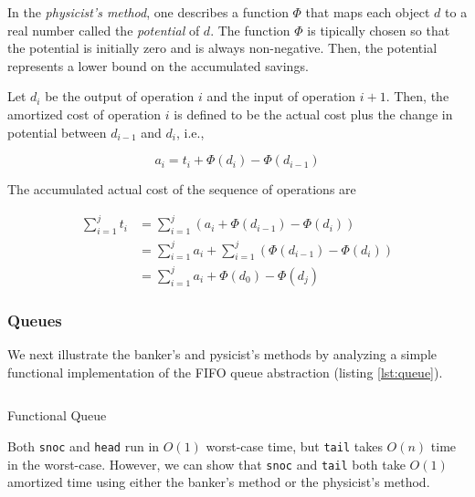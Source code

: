 \documentclass[12pt, a4paper]{article} %
\newcommand{\code}[1]{\texttt{#1}} %
\begin{document}
In the \textit{physicist's method}, one describes a function $\Phi$ that maps each object $d$ to a real number called the \textit{potential} of $d$. The function $\Phi$ is tipically chosen so that the potential is initially zero and is always non-negative. Then, the potential represents a lower bound on the accumulated savings.

Let $d_i$ be the output of operation $i$ and the input of operation $i+1$. Then, the amortized cost of operation $i$ is defined to be the actual cost plus the change in potential between $d_{i-1}$ and $d_i$, i.e.,

\begin{equation}%
\label{physicist's method equation}
  a_i = t_i + \Phi(d_i) - \Phi(d_{i-1})
\end{equation}

The accumulated actual cost of the sequence of operations are

\begin{align*}%
\label{physicist's cost}
  \sum_{i=1}^{j} t_i &= \sum_{i=1}^{j} (a_i + \Phi(d_{i-1}) - \Phi(d_i)) \\
                     &= \sum_{i=1}^{j} a_i + \sum_{i=1}^{j} (\Phi(d_{i-1}) - \Phi(d_i)) \\
                     &= \sum_{i=1}^{j} a_i + \Phi(d_0) - \Phi(d_j)
\end{align*}


\subsubsection{Queues}%
\label{subsub:Queues}

We next illustrate the banker's and pysicist's methods by analyzing a simple functional implementation of the FIFO queue abstraction (listing \ref{lst:queue}).

\begin{listing}[h]
    \inputminted{haskell}{../../Chapter5/BatchedQueue.hs}
    \caption{Functional Queue}
    \label{lst:queue}
\end{listing}

Both \code{snoc} and \code{head} run in $O(1)$ worst-case time, but \code{tail} takes $O(n)$ time in the worst-case. However, we can show that \code{snoc} and \code{tail} both take $O(1)$ amortized time using either the banker's method or the physicist's method.
\end{document}
